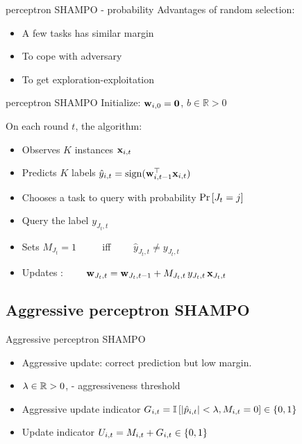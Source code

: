 \documentclass{beamer}
\begin{document}
\begin{frame}{perceptron SHAMPO - probability}
Advantages of   random selection:\newline
\begin{itemize}
\item A few tasks has  similar  margin\newline
\item To cope with adversary\newline
\item To get  exploration-exploitation
\end{itemize}
\end{frame}

\begin{frame}{perceptron SHAMPO }
Initialize: $\mathbf{w}_{i,0}={\boldsymbol{0}}$, $b\in\mathbb{R}>0$\newline

On each round $t$, the algorithm: \newline
\begin{itemize}
\item Observes $K$ instances $\mathbf{x}_{i,t}$  \newline
\item Predicts $K$ labels  $\hat{y}_{i,t}={\rm sign}{({\mathbf{w}}^{\top}_{i,t-1} \mathbf{x}_{i,t})}$ \newline
\item Chooses a task to query  with probability  ${\rm Pr}\left[{J_t=j}\right]$  \newline
\item Query the label $y_{J_t,t}$ \newline
\item Sets $M_{J_t}=1$ ~~~~ iff~~~~ $\hat{y}_{J_t,t}\ne y_{J_t,t}$\newline
\item Updates :~~~~
$\mathbf{w}_{J_t,t} =\mathbf{w}_{J_t,t-1}+M_{J_t,t} \,y_{J_t,t}\, \mathbf{x}_{J_t,t}$
\end{itemize}
\end{frame}




\subsection{Aggressive perceptron SHAMPO}

\begin{frame}{Aggressive perceptron SHAMPO  }
\begin{itemize}
\item Aggressive update: correct prediction but low margin.\newline
\item $\lambda\in \mathbb{R}>0$, -  aggressiveness threshold\newline
\item Aggressive update indicator $G_{i,t}=\mathbb{I}\left[{\left\vert{\hat{p}_{i,t}}\right\vert<\lambda,M_{i,t}=0}\right]\in\left\{{0,1}\right\}$\newline
\item Update  indicator $U_{i,t}=M_{i,t}+G_{i,t}\in\left\{{0,1}\right\}$\newline
\end{itemize}
\end{frame}
\end{document}
